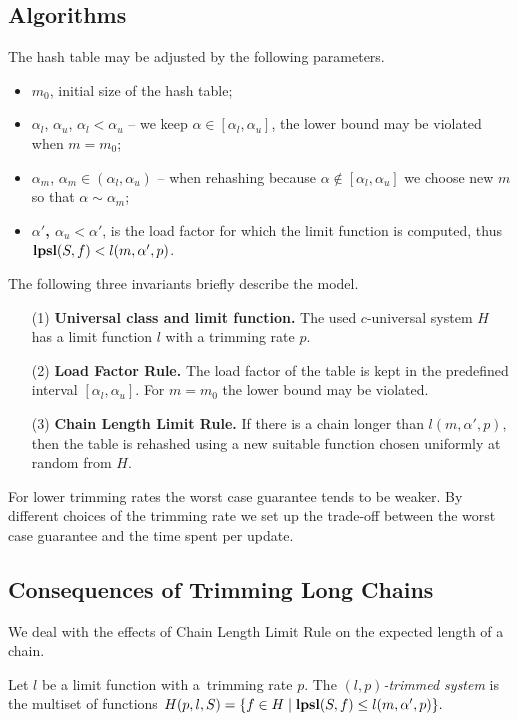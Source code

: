 \subsection{Algorithms}
The hash table may be adjusted by the following parameters.
\begin{itemize}
	\item {$m_0$}, initial size of the hash table;
	\item {$\alpha_l$, $\alpha_u$, $\alpha_l < \alpha_u$} -- we keep $\alpha \in [\alpha_l, \alpha_u]$, the lower bound may be violated when $m = m_0$;
	\item {$\alpha_m$, $\alpha_m \in (\alpha_l, \alpha_u)$} -- when rehashing because $\alpha \notin [\alpha_l, \alpha_u]$ we choose new $m$ so that $\alpha \sim \alpha_m$;
	\item \textbf{$\alpha'$, $\alpha_u < \alpha'$}, is the load factor for which the limit function is computed, thus $\mathbf{lpsl}(S, f) < l(m, \alpha', p)$.
\end{itemize}
The following three invariants briefly describe the model. 
\begin{itemize}
\item[(1)] \textbf{Universal class and limit function.} The used $c$-universal system $H$ has a limit function $l$ with a trimming rate $p$.
\item[(2)] \textbf{Load Factor Rule.} The load factor of the table is kept in the predefined interval $[\alpha_l, \alpha_u]$. For $m = m_0$ the lower bound may be violated.
\item[(3)] \textbf{Chain Length Limit Rule.} If there is a chain longer than $l(m, \alpha', p)$, then the table is rehashed using a new suitable function chosen uniformly at random from $H$.
\end{itemize}

For lower trimming rates the worst case guarantee tends to be weaker.
By different choices of the trimming rate we set up the trade-off between the worst case guarantee and the time spent per update.



\subsection{Consequences of Trimming Long Chains}
We deal with the effects of Chain Length Limit Rule on the expected length of a chain.

\begin{definition}
\label{definition-trimmed-system}
Let $l$ be a limit function with a~trimming rate $p$.
The \emph{$(l, p)$-trimmed system} is the multiset of functions $H(p, l, S) = \{ f \in H \mid \mathbf{lpsl}(S, f) \leq l(m, \alpha', p) \}.$
\end{definition}

